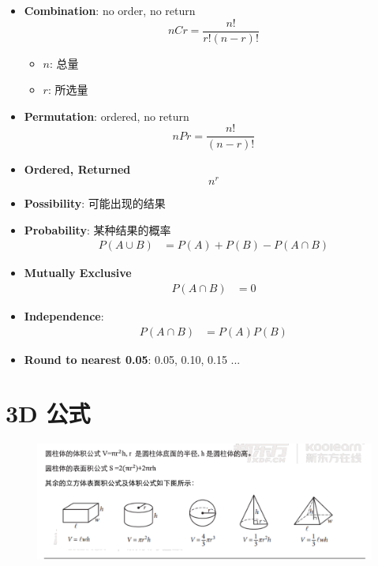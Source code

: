 \begin{multicols}{2}
\begin{itemize}
    \item \textbf{Combination}: no order, no return
    \begin{equation}
      n C r = \frac{n!}{r! \left( n - r \right)!}
    \end{equation}
    \begin{itemize}
      \item $ n $: 总量
      \item $ r $: 所选量
    \end{itemize}

    \item \textbf{Permutation}: ordered, no return
    \begin{equation}
      n P r = \frac{n!}{\left( n - r \right)!}
    \end{equation}

    \item \textbf{Ordered, Returned}
    \begin{equation}
      n^{r}
    \end{equation}

    \item \textbf{Possibility}: 可能出现的结果
    \item \textbf{Probability}: 某种结果的概率
    \begin{align}
      P\left( A \cup B \right) &= P\left( A \right) + P\left( B \right) - P\left( A \cap B \right)
    \end{align}

    \item \textbf{Mutually Exclusive}
    \begin{align}
      P\left( A \cap B \right) &= 0
    \end{align}

    \item \textbf{Independence}:
    \begin{align}
      P\left( A \cap B \right) &= P\left( A \right) P\left( B \right)
    \end{align}

    \item \textbf{Round to nearest 0.05}: 0.05, 0.10, 0.15 ...
  \end{itemize}
\end{multicols}

\section{3D 公式}

  \begin{figure}[H]
    \centering
    \includegraphics[width=\columnwidth]{images/remember-before-test/3d-equations.png}
  \end{figure}
